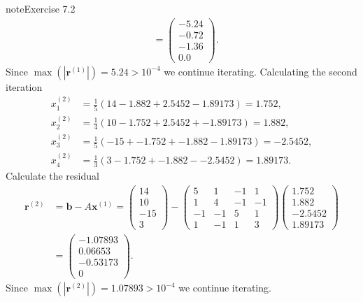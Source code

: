 \documentclass[letterpaper,10pt,english]{jupyterBook}
\begin{document}
\begin{sphinxadmonition}{note}{Exercise 7.2}
\begin{align*}
    &=
    \begin{pmatrix} -5.24 \\ -0.72 \\ -1.36 \\ 0.0 \end{pmatrix}.
\end{align*}
\sphinxAtStartPar
Since \(\max(| \mathbf{r}^{(1)} |) = 5.24 > 10^{-4}\) we continue iterating. Calculating the second iteration
\begin{align*}
    x_{1}^{(2)} &= \frac{1}{5} \left( 14 - 1.882 + 2.5452 - 1.89173 \right) = 1.752, \\
    x_{2}^{(2)} &= \frac{1}{4} \left( 10 - 1.752 + 2.5452 + -1.89173 \right) = 1.882, \\
    x_{3}^{(2)} &= \frac{1}{5} \left( -15 + -1.752 + -1.882 - 1.89173 \right) = -2.5452, \\
    x_{4}^{(2)} &= \frac{1}{3} \left( 3 - 1.752 + -1.882 - -2.5452 \right) = 1.89173.
\end{align*}
\sphinxAtStartPar
Calculate the residual
\begin{align*}
    \mathbf{r}^{(2)} &= \mathbf{b} - A \mathbf{x}^{(1)} = 
    \begin{pmatrix} 14 \\ 10 \\ -15 \\ 3 \end{pmatrix} -
    \begin{pmatrix} 5 & 1 & -1 & 1 \\ 1 & 4 & -1 & -1 \\ -1 & -1 & 5 & 1 \\ 1 & -1 & 1 & 3 \end{pmatrix}
    \begin{pmatrix} 1.752 \\ 1.882 \\ -2.5452 \\ 1.89173 \end{pmatrix} \\
    &=
    \begin{pmatrix} -1.07893 \\ 0.06653 \\ -0.53173 \\ 0 \end{pmatrix}.
\end{align*}
\sphinxAtStartPar
Since \(\max(| \mathbf{r}^{(2)} |) = 1.07893 > 10^{-4}\) we continue iterating.
\end{sphinxadmonition}
\end{document}
